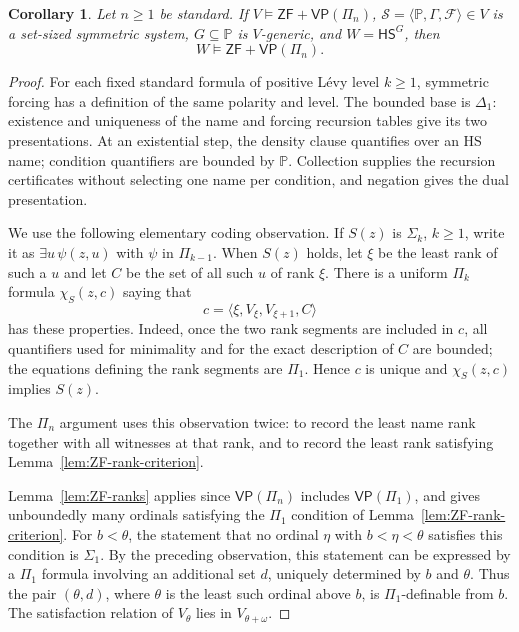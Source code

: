 \documentclass[11pt,a4paper]{amsart}
\newcommand{\VP}{\mathsf{VP}}
\newcommand{\ZF}{\mathsf{ZF}}
\newcommand{\HS}{\mathsf{HS}}
\theoremstyle{plain}
\newtheorem{corollary}[theorem]{Corollary}
\theoremstyle{definition}
\theoremstyle{remark}
\begin{document}
\begingroup

\begin{corollary}\label{cor:Pi-preservation}
Let $n\geq1$ be standard.  If $V\models\ZF+\VP(\Pi_n)$, $\mathscr S=\langle\mathbb P,\Gamma,\mathcal F\rangle\in V$ is a set-sized symmetric system, $G\subseteq\mathbb P$ is $V$-generic, and $W=\HS^G$, then
\[
W\models\ZF+\VP(\Pi_n).
\]
\end{corollary}

\begin{proof}
{For each fixed standard formula of positive L\'evy level $k\geq1$, symmetric forcing has a definition of the same polarity and level.  The bounded base is $\Delta_1$: existence and uniqueness of the name and forcing recursion tables give its two presentations.  At an existential step, the density clause quantifies over an HS name; condition quantifiers are bounded by $\mathbb P$.  Collection supplies the recursion certificates without selecting one name per condition, and negation gives the dual presentation.}

We use the following elementary coding observation.  If $S(z)$ is $\Sigma_k$, $k\geq1$, write it as $\exists u\,\psi(z,u)$ with $\psi$ in $\Pi_{k-1}$.  When $S(z)$ holds, let $\xi$ be the least rank of such a $u$ and let $C$ be the set of all such $u$ of rank $\xi$.  There is a uniform $\Pi_k$ formula $\chi_S(z,c)$ saying that
\[
c=\langle\xi,V_\xi,V_{\xi+1},C\rangle
\]
has these properties.  Indeed, once the two rank segments are included in $c$, all quantifiers used for minimality and for the exact description of $C$ are bounded; the equations defining the rank segments are $\Pi_1$.  Hence $c$ is unique and $\chi_S(z,c)$ implies $S(z)$.

The $\Pi_n$ argument uses this observation twice: to record the least name rank together with all witnesses at that rank, and to record the least rank satisfying Lemma~\ref{lem:ZF-rank-criterion}.

{Lemma~\ref{lem:ZF-ranks} applies since $\VP(\Pi_n)$ includes $\VP(\Pi_1)$, and gives unboundedly many ordinals satisfying the $\Pi_1$ condition of Lemma~\ref{lem:ZF-rank-criterion}.  For $b<\theta$, the statement that no ordinal $\eta$ with $b<\eta<\theta$ satisfies this condition is $\Sigma_1$.  By the preceding observation, this statement can be expressed by a $\Pi_1$ formula involving an additional set $d$, uniquely determined by $b$ and $\theta$.  Thus the pair $(\theta,d)$, where $\theta$ is the least such ordinal above $b$, is $\Pi_1$-definable from $b$.}  The satisfaction relation of $V_\theta$ lies in $V_{\theta+\omega}$.


\end{proof}
\end{document}
